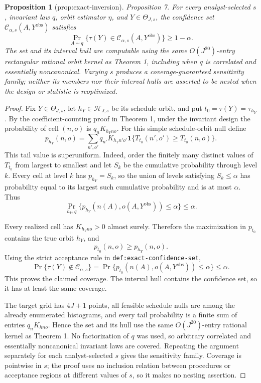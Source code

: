 \documentclass{article}
\newtheorem{proposition}{Proposition}
\begin{document}
\begin{proposition}[prop:exact-inversion]\label{prop:exact-inversion}
Proposition 7. For every analyst-selected \(s\), invariant law \(q\), orbit estimator \(\eta\), and \(Y\in\Theta_{J,s}\), the confidence set \(\mathcal C_{\alpha,s}(A,Y^{\mathrm{obs}})\) satisfies \[\Pr_{A\sim q}\{\tau(Y)\in\mathcal C_{\alpha,s}(A,Y^{\mathrm{obs}})\}\ge1-\alpha.\] The set and its interval hull are computable using the same \(O(J^{20})\)-entry rectangular rational orbit kernel as Theorem 1, including when \(q\) is correlated and essentially noncanonical. Varying \(s\) produces a coverage-guaranteed sensitivity family; neither its members nor their interval hulls are asserted to be nested when the design or statistic is reoptimized.
\end{proposition}
\begin{proof}
Fix \(Y\in\Theta_{J,s}\), let \(h_Y\in\mathcal H_{J,s}\) be its schedule orbit, and put \(t_0=\tau(Y)=\tau_{h_Y}\). By the coefficient-counting proof in Theorem 1, under the invariant design the probability of cell \((n,o)\) is \(q_nK_{h_Yno}\). For this simple schedule-orbit null define
\[
 p_{h_Y}(n,o)=\sum_{n',o'}q_{n'}K_{h_Yn'o'}
 \mathbf 1\{T_{t_0}(n',o')\ge T_{t_0}(n,o)\}.
\]
This tail value is superuniform. Indeed, order the finitely many distinct values of \(T_{t_0}\) from largest to smallest and let \(S_k\) be the cumulative probability through level \(k\). Every cell at level \(k\) has \(p_{h_Y}=S_k\), so the union of levels satisfying \(S_k\le\alpha\) has probability equal to its largest such cumulative probability and is at most \(\alpha\). Thus
\[
 \Pr_{h_Y,q}\{p_{h_Y}(n(A),o(A,Y^{\mathrm{obs}}))\le\alpha\}\le\alpha.
\]

Every realized cell has \(K_{h_Yno}>0\) almost surely. Therefore the maximization in \(p_{t_0}\) contains the true orbit \(h_Y\), and
\[
 p_{t_0}(n,o)\ge p_{h_Y}(n,o).
\]
Using the strict acceptance rule in \texttt{def:exact-confidence-set},
\[
 \Pr\{\tau(Y)\notin\mathcal C_{\alpha,s}\}
 =\Pr\{p_{t_0}(n(A),o(A,Y^{\mathrm{obs}}))\le\alpha\}
 \le\alpha.
\]
This proves the claimed coverage. The interval hull contains the confidence set, so it has at least the same coverage.

The target grid has \(4J+1\) points, all feasible schedule nulls are among the already enumerated histograms, and every tail probability is a finite sum of entries \(q_nK_{hno}\). Hence the set and its hull use the same \(O(J^{20})\)-entry rational kernel as Theorem 1. No factorization of \(q\) was used, so arbitrary correlated and essentially noncanonical invariant laws are covered. Repeating the argument separately for each analyst-selected \(s\) gives the sensitivity family. Coverage is pointwise in \(s\); the proof uses no inclusion relation between procedures or acceptance regions at different values of \(s\), so it makes no nesting assertion.
\end{proof}
\end{document}
